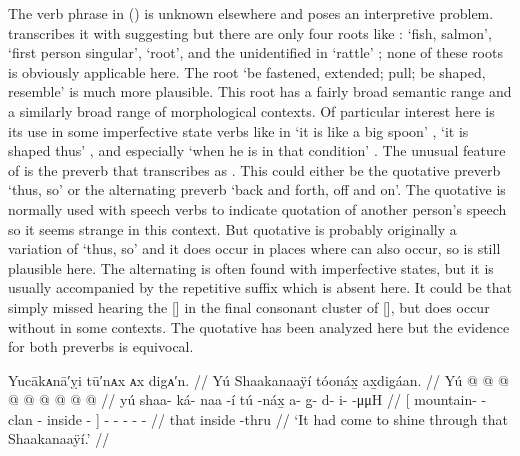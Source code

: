 The verb phrase  in (\lastx) is unknown elsewhere and poses an interpretive problem.
\citeauthor{swanton:1909} transcribes it with  suggesting  but there are only four roots like :  ‘fish, salmon’,  ‘first person singular’,  ‘root’, and the unidentified  in  ‘rattle’ \parencites[788]{leer:1976}[68]{leer:1978b}; none of these roots is obviously applicable here.
The root  ‘be fastened, extended; pull; be shaped, resemble’ is much more plausible.
This root has a fairly broad semantic range and a similarly broad range of morphological contexts.
Of particular interest here is its use in some imperfective state verbs like in  ‘it is like a big spoon’ \parencite[172.2363]{story-naish:1973},  ‘it is shaped thus’ \parencite[607]{leer:1976}, and especially  ‘when he is in that condition’ \parencite[f03/8]{leer:1973}.
The unusual feature of  is the preverb that \citeauthor{swanton:1909} transcribes as .
This could either be the quotative preverb  ‘thus, so’ or the alternating preverb  ‘back and forth, off and on’.
The quotative  is normally used with speech verbs to indicate quotation of another person’s speech so it seems strange in this context.
But quotative  is probably originally a variation of  ‘thus, so’ and it does occur in places where  can also occur, so  is still plausible here.
The alternating  is often found with imperfective states, but it is usually accompanied by the repetitive suffix  which is absent here.
It could be that \citeauthor{swanton:1909} simply missed hearing the [] in the final consonant cluster of [], but  does occur without  in some contexts.
The quotative  has been analyzed here but the evidence for both preverbs is equivocal.

\ex\label{ex:92-166-shone-thru-shaakanaayi}%
%
\begingl
	\glpreamble	Yucākᴀnā′ỵi tū′nᴀx ᴀx digᴀ′n. //
	\glpreamble	Yú Shaakanaaÿí tóonáx̱ ax̱digáan. //
	\gla	{} Yú  @ {} @ {} @ {}  @ {} {}
		 @ {} @ {} @ {} @ {} @ {} //
	\glb	{} yú shaa- ká- naa -í tú -náx̱ {}
		a- g̱- d- i-  -μμH //
	\glc	{}[  mountain- - clan -
			inside - {}]
		- - - -  - //
	\gld	{} that  {} {} {} inside -thru {}
		 //
	\glft	‘It had come to shine through that Shaakanaaÿí.’
		//
\endgl
\xe

